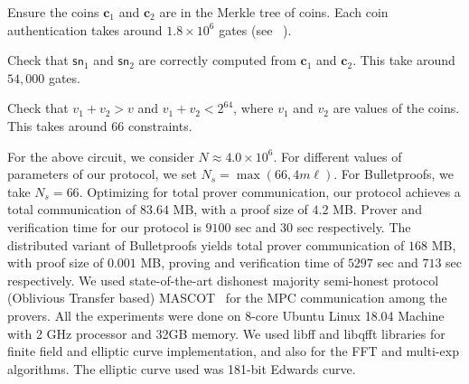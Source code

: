 Ensure the coins $\bm{c}_1$ and $\bm{c}_2$ are in the Merkle tree of
coins. Each coin authentication takes around $1.8\times 10^6$ gates (see
~\cite[Section 5.2.2]{zerocashext}).

Check that $\mathsf{sn}_1$ and $\mathsf{sn}_2$ are correctly computed from $\bm{c}_1$ and $\bm{c}_2$. This take around $54,000$ gates.

Check that $v_1+v_2>v$ and $v_1+v_2 < 2^{64}$, where $v_1$ and $v_2$ are values of the coins. This takes around 66 constraints.

For the above circuit, we consider $N\approx 4.0\times 10^6$. For different
values of parameters of our protocol, we set $N_s=\max(66,4m\ell)$.
For Bulletproofs, we take $N_s=66$. Optimizing for total prover communication, our
protocol achieves a total communication of $83.64$ MB, with a proof size of
$4.2$ MB. Prover and verification time for our protocol is  $9100$ sec and $30$ sec
respectively. The distributed variant of Bulletproofs yields total prover
communication of $168$ MB, with proof size of $0.001$ MB, proving and
verification time of $5297$ sec and $713$ sec respectively. 
We used state-of-the-art dishonest majority semi-honest protocol (Oblivious Transfer based) MASCOT~\cite{KOS16} for the MPC communication among the provers. All the experiments were done on 8-core Ubuntu Linux 18.04 Machine with 2 GHz processor and 32GB memory. We used libff and libqfft libraries for finite field and elliptic curve implementation, and also for the FFT and multi-exp algorithms. The elliptic curve used was 181-bit Edwards curve. 
